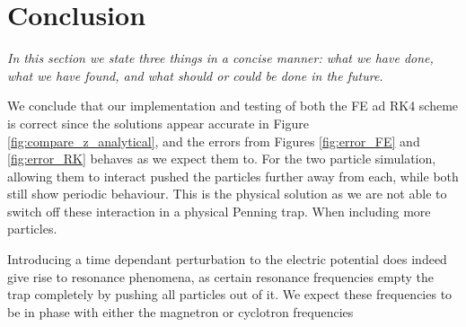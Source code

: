 \section{Conclusion}\label{sec:conclusion}
\textit{In this section we state three things in a concise manner: what we have done, what we have found, and what should or could be done in the future.}

We conclude that our implementation and testing of both the FE ad RK4 scheme is correct since the solutions appear accurate in Figure \ref{fig:compare_z_analytical}, and the errors from Figures \ref{fig:error_FE} and \ref{fig:error_RK} behaves as we expect them to. For the two particle simulation, allowing them to interact pushed the particles further away from each, while both still show periodic behaviour. This is the physical solution as we are not able to switch off these interaction in a physical Penning trap. When including more particles. 

Introducing a time dependant perturbation to the electric potential does indeed give rise to resonance phenomena, as certain resonance frequencies empty the trap completely by pushing all particles out of it. We expect these frequencies to be in phase with either the magnetron or cyclotron frequencies 

